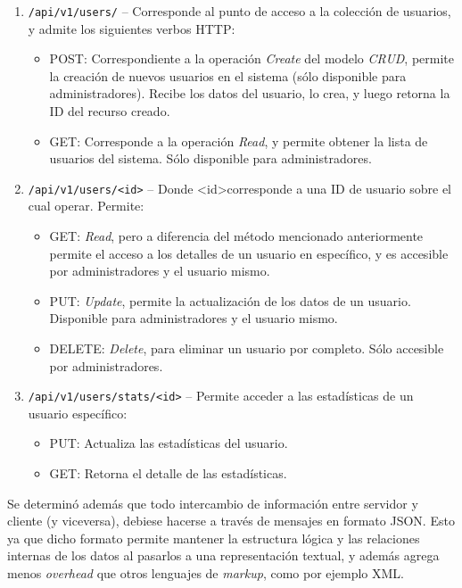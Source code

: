 \documentclass[11pt,letterpaper]{article}
\begin{document}
\begin{enumerate}
    \item \texttt{/api/v1/users/} -- Corresponde al punto de acceso a la colección de usuarios, y admite los siguientes verbos HTTP:
    \begin{itemize}
        \item POST: Correspondiente a la operación \emph{Create} del modelo \emph{CRUD}, permite la creación de nuevos usuarios en el sistema (sólo disponible para administradores). Recibe los datos del usuario, lo crea, y luego retorna la ID del recurso creado.
        \item GET: Corresponde a la operación \emph{Read}, y permite obtener la lista de usuarios del sistema. Sólo disponible para administradores.
    \end{itemize}
    \newpage
    \item \texttt{/api/v1/users/\textless id\textgreater} -- Donde \textless id\textgreater \@ corresponde a una ID de usuario sobre el cual operar. Permite:
    \begin{itemize}
        \item GET: \emph{Read}, pero a diferencia del método mencionado anteriormente permite el acceso a los detalles de un usuario en específico, y es accesible por administradores y el usuario mismo.
        \item PUT: \emph{Update}, permite la actualización de los datos de un usuario. Disponible para administradores y el usuario mismo.
        \item DELETE: \emph{Delete}, para eliminar un usuario por completo. Sólo accesible por administradores.
    \end{itemize}
    \item \texttt{/api/v1/users/stats/\textless id\textgreater} -- Permite acceder a las estadísticas de un usuario específico:
    \begin{itemize}
        \item PUT: Actualiza las estadísticas del usuario.
        \item GET: Retorna el detalle de las estadísticas.
    \end{itemize}
\end{enumerate}

Se determinó además que todo intercambio de información entre servidor y cliente (y viceversa), debiese hacerse a través de mensajes en formato JSON. Esto ya que dicho formato permite mantener la estructura lógica y las relaciones internas de los datos al pasarlos a una representación textual, y además agrega menos \emph{overhead} que otros lenguajes de \emph{markup}, como por ejemplo XML.\\
\end{document}
